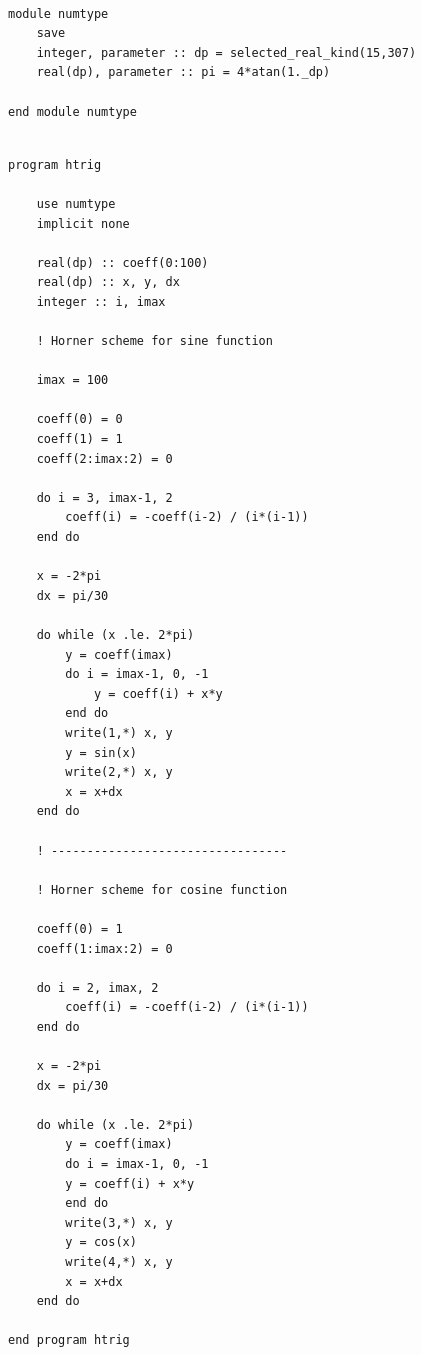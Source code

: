 \documentclass[12pt]{article}
\begin{document}
\begin{lstlisting}[frame=single,caption={Module {\tt numtype}},label=module]

module numtype
    save
    integer, parameter :: dp = selected_real_kind(15,307)
    real(dp), parameter :: pi = 4*atan(1._dp)
    
end module numtype

\end{lstlisting}

\begin{lstlisting}[frame=single,caption={Program {\tt htrig.f90}},label=htrigf90]

program htrig

    use numtype
    implicit none

    real(dp) :: coeff(0:100)
    real(dp) :: x, y, dx
    integer :: i, imax

    ! Horner scheme for sine function

    imax = 100

    coeff(0) = 0
    coeff(1) = 1
    coeff(2:imax:2) = 0

    do i = 3, imax-1, 2
        coeff(i) = -coeff(i-2) / (i*(i-1))
    end do

    x = -2*pi
    dx = pi/30

    do while (x .le. 2*pi)
        y = coeff(imax)
        do i = imax-1, 0, -1
            y = coeff(i) + x*y 
        end do
        write(1,*) x, y
        y = sin(x)
        write(2,*) x, y
        x = x+dx
    end do 

    ! ---------------------------------
    
    ! Horner scheme for cosine function

    coeff(0) = 1
    coeff(1:imax:2) = 0

    do i = 2, imax, 2
        coeff(i) = -coeff(i-2) / (i*(i-1))
    end do

    x = -2*pi
    dx = pi/30

    do while (x .le. 2*pi)
        y = coeff(imax)
        do i = imax-1, 0, -1
        y = coeff(i) + x*y 
        end do
        write(3,*) x, y
        y = cos(x)
        write(4,*) x, y
        x = x+dx
    end do 

end program htrig

\end{lstlisting}
\end{document}

